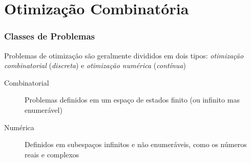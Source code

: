 \documentclass{beamer}
\begin{document}
\section{Otimização Combinatória}


\begin{frame}[fragile]
    \frametitle{Classes de Problemas}
    
    Problemas de otimização são geralmente divididos em dois tipos: \emph{otimização combinatorial} (\textit{discreta}) e
    \emph{otimização numérica} (\textit{contínua})
    \hspace{5em}
    \begin{description}
    \item[Combinatorial] Problemas definidos em um espaço de estados finito (ou infinito mas enumerável)
    \item[Numérica] Definidos em subespaços infinitos e não enumeráveis, como os números
    reais e complexos
    \end{description}
\end{frame}

\end{document}
